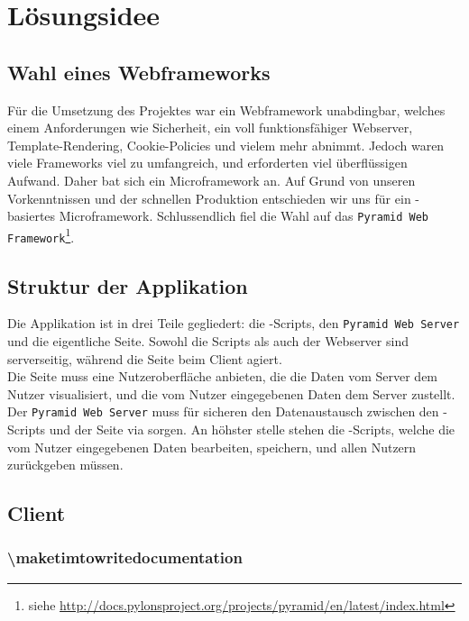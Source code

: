 \chapter{Lösungsidee}
\section{Wahl eines Webframeworks}
Für die Umsetzung des Projektes war ein Webframework unabdingbar, welches einem Anforderungen wie Sicherheit,  %
ein voll funktionsfähiger Webserver, Template-Rendering, Cookie-Policies und vielem mehr abnimmt. Jedoch waren %
viele Frameworks viel zu umfangreich, und erforderten viel überflüssigen Aufwand. Daher bat sich ein Microframework
an. Auf Grund von unseren Vorkenntnissen und der schnellen Produktion entschieden wir uns für ein \Python-basiertes
Microframework.
Schlussendlich fiel die Wahl auf das \texttt{Pyramid Web Framework}\footnote{siehe \url{http://docs.pylonsproject.org/projects/pyramid/en/latest/index.html}}.

\section{Struktur der Applikation}
Die Applikation ist in drei Teile gegliedert: die \Python-Scripts, den \texttt{Pyramid Web Server} und die eigentliche Seite.
Sowohl die Scripts als auch der Webserver sind serverseitig, während die Seite beim Client agiert.\\
Die Seite muss eine Nutzeroberfläche anbieten, die die Daten vom Server dem Nutzer visualisiert, und die vom
Nutzer eingegebenen Daten dem Server zustellt. Der \texttt{Pyramid Web Server} muss für sicheren den Datenaustausch zwischen den 
\Python-Scripts und der Seite via sorgen. An höhster stelle stehen die \Python-Scripts, welche die vom Nutzer eingegebenen Daten
bearbeiten, speichern, und allen Nutzern zurückgeben müssen.



\section{Client} %
\subsection{\textbackslash maketimtowritedocumentation}

 
